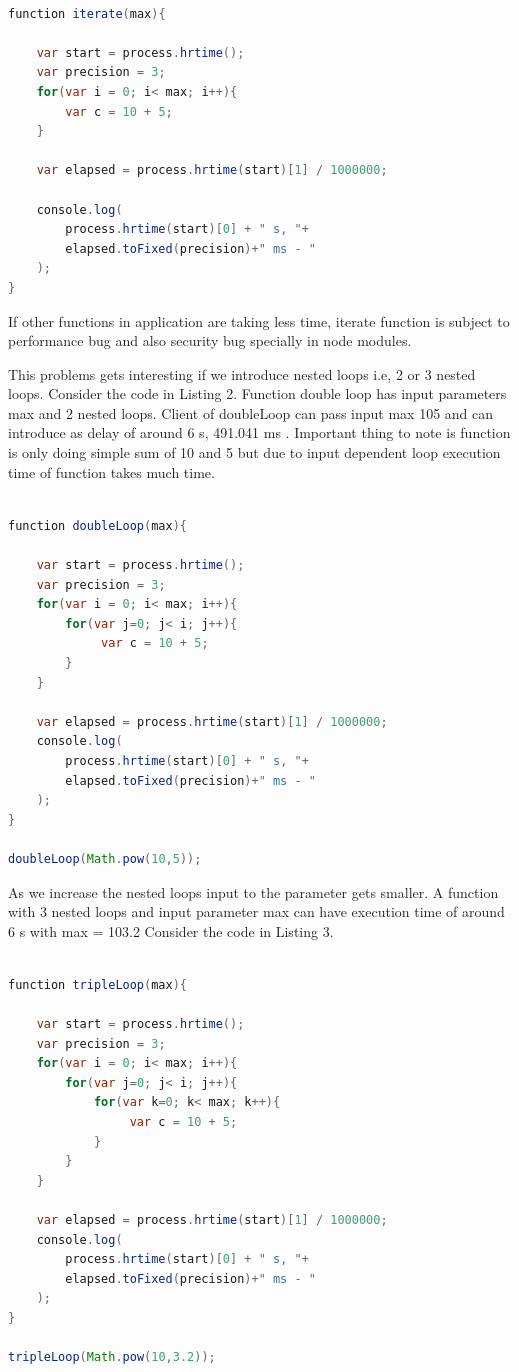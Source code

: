 \documentclass[authoryear,preprint]{sigplanconf}
\begin{document}
\begin{lstlisting}[caption=iterate function with single loop,label=l:iterate,language=Java]

function iterate(max){

    var start = process.hrtime();
    var precision = 3;
    for(var i = 0; i< max; i++){
        var c = 10 + 5;
    }

    var elapsed = process.hrtime(start)[1] / 1000000;
    
	console.log(
		process.hrtime(start)[0] + " s, "+
		elapsed.toFixed(precision)+" ms - " 
	);
}

\end{lstlisting}

If other functions in application are taking less time, iterate
function is subject to performance bug and also security bug specially
in node modules.

This problems gets interesting if we introduce nested loops
i.e, 2 or 3 nested loops. Consider the code in Listing 2. Function
double loop has input parameters max and 2 nested loops. Client
of doubleLoop can pass input max 105
and can introduce as delay
of around 6 s, 491.041 ms . Important thing to note is function is
only doing simple sum of 10 and 5 but due to input dependent loop
execution time of function takes much time.

\begin{lstlisting}[caption=doubleLoop function with 2 nested loop,label=l:doubleLoop,language=Java]

function doubleLoop(max){

    var start = process.hrtime();
    var precision = 3;
    for(var i = 0; i< max; i++){
    	for(var j=0; j< i; j++){
			 var c = 10 + 5;
 		}
 	}

    var elapsed = process.hrtime(start)[1] / 1000000;
	console.log(
		process.hrtime(start)[0] + " s, "+
		elapsed.toFixed(precision)+" ms - " 
	);
}

doubleLoop(Math.pow(10,5));

\end{lstlisting}

As we increase the nested loops input to the parameter gets
smaller. A function with 3 nested loops and input parameter max
can have execution time of around 6 s with max = 103.2
Consider the code in Listing 3.

\begin{lstlisting}[caption=tripleLoop function with 2 nested loop,label=l:tripleLoop,language=Java]

function tripleLoop(max){

    var start = process.hrtime();
    var precision = 3;
    for(var i = 0; i< max; i++){
    	for(var j=0; j< i; j++){
    		for(var k=0; k< max; k++){
				 var c = 10 + 5;
 			}
 		}
 	}

    var elapsed = process.hrtime(start)[1] / 1000000;
	console.log(
		process.hrtime(start)[0] + " s, "+
		elapsed.toFixed(precision)+" ms - " 
	);
}

tripleLoop(Math.pow(10,3.2));

\end{lstlisting}
\end{document}
